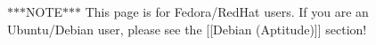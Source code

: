 $\ast$$\ast$$\ast$\-N\-O\-T\-E$\ast$$\ast$$\ast$ This page is for Fedora/\-Red\-Hat users. If you are an Ubuntu/\-Debian user, please see the \mbox{[}\mbox{[}Debian (Aptitude)\mbox{]}\mbox{]} section! 